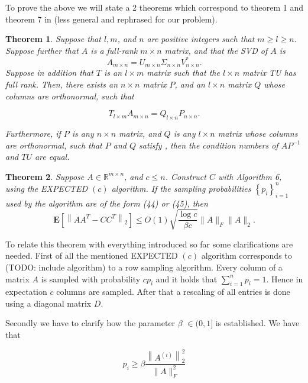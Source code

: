 \documentclass{article}
\newtheorem{theorem}{Theorem}
\begin{document}
To prove the above we will state a 2 theorems which correspond to theorem 1
\cite{CUR} and theorem 7 in \cite{randalg} (less general and rephrased for our
problem).

\begin{theorem} \label{thm_2}
Suppose that $l, m$, and $n$ are positive integers such that $m \geq l \geq n$.
Suppose further that $A$ is a full-rank $m \times n$ matrix, and that the SVD
of $A$ is
$$
A_{m \times n}=U_{m \times n} \Sigma_{n \times n} V_{n \times n}^{*} .
$$
Suppose in addition that $T$ is an $l \times m$ matrix such that the $l \times
n$ matrix TU has full rank.
Then, there exists an $n \times n$ matrix $P$, and an $l \times n$ matrix $Q$
whose columns are orthonormal, such that

\begin{equation} \label{equ_thm2}
T_{l \times m} A_{m \times n}=Q_{l \times n} P_{n \times n} .
\end{equation}

Furthermore, if $P$ is any $n \times n$ matrix, and $Q$ is any $l \times n$
matrix whose columns are orthonormal, such that $P$ and $Q$ satisfy \label{equ_thm2},
then the condition numbers of $A P^{-1}$ and $T U$ are equal.
\end{theorem}

\begin{theorem} \label{thm_3}
Suppose $A \in \mathbb{R}^{m \times n}$, and $c
\leq n$. Construct $C$ with Algorithm 6, using the EXPECTED $(c)$
algorithm. If the sampling probabilities $\left\{p_{i}\right\}_{i=1}^{n}$ used
by the algorithm are of the form (44) or (45), then
$$
\mathbf{E}\left[\left\|A A^{T}-C C^{T}\right\|_{2}\right] \leq O(1) \sqrt{\frac{\log c}{\beta c}}\|A\|_{F}\|A\|_{2} .
$$
\end{theorem}

To relate this theorem with everything introduced so far some clarifications
are needed. First of all the mentioned EXPECTED $(c)$ algorithm corresponds to
(TODO: include algorithm) to a row sampling algorithm. Every column of a matrix
$A$ is sampled with probability $c p_i$ and it holds that $\sum_{i=1}^{n} p_i =
1$. Hence in expectation $c$ columns are sampled. After that a rescaling of all
entries is done using a diagonal matrix $D$.

Secondly we have to clarify how the parameter $\beta$ $\in (0,1]$ is
established. We have that

\begin{equation} \label{eq_beta}
p_i \geq \beta \frac{\left\|A^{(i)}\right\|^2_2}{\|A\|_{F}^2}
\end{equation}
\end{document}
